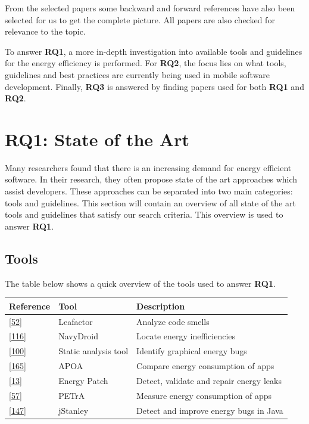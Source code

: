 \documentclass[]{book}
\begin{document}
From the selected papers some backward and forward references have also
been selected for us to get the complete picture. All papers are also
checked for relevance to the topic.

To answer \textbf{RQ1}, a more in-depth investigation into available
tools and guidelines for the energy efficiency is performed. For
\textbf{RQ2}, the focus lies on what tools, guidelines and best
practices are currently being used in mobile software development.
Finally, \textbf{RQ3} is answered by finding papers used for both
\textbf{RQ1} and \textbf{RQ2}.

\section{RQ1: State of the Art}\label{rq1-state-of-the-art}

Many researchers found that there is an increasing demand for energy
efficient software. In their research, they often propose state of the
art approaches which assist developers. These approaches can be
separated into two main categories: tools and guidelines. This section
will contain an overview of all state of the art tools and guidelines
that satisfy our search criteria. This overview is used to answer
\textbf{RQ1}.

\subsection{Tools}\label{tools}

The table below shows a quick overview of the tools used to answer
\textbf{RQ1}.

\begin{longtable}[]{@{}lll@{}}
\toprule
Reference & Tool & Description\tabularnewline
\midrule
\endhead
{[}\protect\hyperlink{ref-CA2018}{52}{]} & Leafactor & Analyze code
smells\tabularnewline
{[}\protect\hyperlink{ref-LWXM2017}{116}{]} & NavyDroid & Locate energy
inefficiencies\tabularnewline
{[}\protect\hyperlink{ref-KKK2016}{100}{]} & Static analysis tool &
Identify graphical energy bugs\tabularnewline
{[}\protect\hyperlink{ref-SKHA2018}{165}{]} & APOA & Compare energy
consumption of apps\tabularnewline
{[}\protect\hyperlink{ref-BCBR2017}{13}{]} & Energy Patch & Detect,
validate and repair energy leaks\tabularnewline
{[}\protect\hyperlink{ref-NPPPZL2017B}{57}{]} & PETrA & Measure energy
consumption of apps\tabularnewline
{[}\protect\hyperlink{ref-PSCS2018}{147}{]} & jStanley & Detect and
improve energy bugs in Java\tabularnewline
\bottomrule
\end{longtable}
\end{document}

